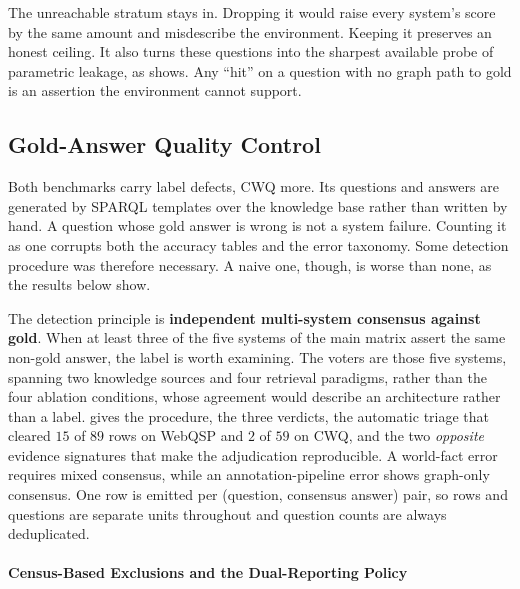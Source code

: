 The \textsf{unreachable} stratum stays in. Dropping it would raise every
system's score by the same amount and misdescribe the environment. Keeping it
preserves an honest ceiling. It also turns these questions into the sharpest
available probe of parametric leakage, as  shows.
Any ``hit'' on a question with no graph path to gold is an assertion the
environment cannot support.

\subsection{Gold-Answer Quality Control}\label{sec:gold-quality}

Both benchmarks carry label defects, CWQ more. Its questions
and answers are generated by SPARQL templates over the knowledge base rather
than written by hand. A question whose gold answer is wrong is not a system
failure. Counting it as one corrupts both the accuracy tables and the error
taxonomy. Some detection procedure was therefore necessary. A naive one, though,
is worse than none, as the results below show.

The detection principle is \textbf{independent multi-system consensus against
gold}. When at least three of the five systems of the main matrix assert the
same non-gold answer, the label is worth examining. The voters are those five
systems, spanning two knowledge sources and four retrieval paradigms, rather
than the four ablation conditions, whose agreement would describe an
architecture rather than a label.  gives the procedure, the
three verdicts, the automatic triage that cleared $15$ of $89$ rows on WebQSP
and $2$ of $59$ on CWQ, and the two \emph{opposite} evidence signatures that
make the adjudication reproducible. A world-fact error requires mixed consensus,
while an annotation-pipeline error shows graph-only consensus. One row is
emitted per (question, consensus answer) pair, so rows and questions are
separate units throughout and question counts are always deduplicated.

\paragraph{Census-Based Exclusions and the Dual-Reporting Policy}


